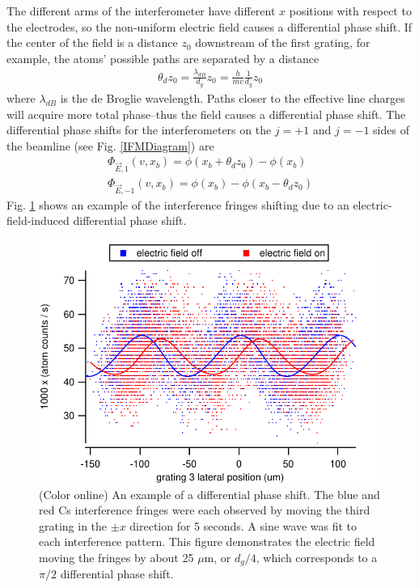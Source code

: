 \documentclass[twocolumn,prl,showpacs,superscriptaddress]{revtex4-1}   %
\newcommand{\figref}[1]{Fig. \ref{#1}}
\begin{document}
The different arms of the interferometer have different $x$ positions with respect to the electrodes, so the non-uniform electric field causes a differential phase shift. If the center of the field is a distance $z_0$ downstream of the first grating, for example, the atoms' possible paths are separated by a distance 
\begin{align}
	\theta_d z_0 = \frac{\lambda_{dB}}{d_g} z_0 = \frac{h}{mv}\frac{1}{d_g} z_0
	\label{pathSeparation}
\end{align}
where $\lambda_{dB}$ is the de Broglie wavelength. Paths closer to the effective line charges will acquire more total phase--thus the field causes a differential phase shift. The differential phase shifts for the interferometers on the $j=+1$ and $j=-1$ sides of the beamline (see \figref{IFMDiagram}) are
\begin{align}
	\Phi_{\vec{E},1}(v,x_b) = \phi(x_b+\theta_d z_0) - \phi(x_b) \nonumber \\
	\Phi_{\vec{E},-1}(v,x_b) = \phi(x_b) - \phi(x_b-\theta_d z_0)
	\label{deltaPhasePillars}
\end{align}
\figref{phaseShiftExample} shows an example of the interference fringes shifting due to an electric-field-induced differential phase shift.

\begin{figure}
\includegraphics[width=\linewidth,keepaspectratio]{countsVsGratingPos_150420.pdf}
\caption{\label{phaseShiftExample}(Color online) An example of a differential phase shift. The blue and red Cs interference fringes were each observed by moving the third grating in the $\pm x$ direction for 5 seconds. A sine wave was fit to each interference pattern. This figure demonstrates the electric field moving the fringes by about 25 $\mu$m, or $d_g/4$, which corresponds to a $\pi/2$ differential phase shift.}
\end{figure}
\end{document}
